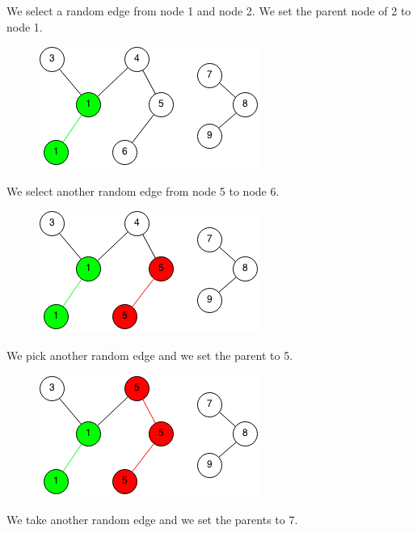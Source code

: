 \documentclass[11pt,oneside]{book}
\makeatletter
\def\maxwidth#1{\ifdim\Gin@nat@width>#1 #1\else\Gin@nat@width\fi}
\makeatother
\begin{document}
We select a random edge from node 1 and node 2. We set the parent node of 2 to node 1.

\vspace{5px}\begin{figure}[H]\centering
        \includegraphics[width=0.66\maxwidth{\textwidth}]{connectedcomponents2.png}
        \end{figure}

We select another random edge from node 5 to node 6.

\vspace{5px}\begin{figure}[H]\centering
        \includegraphics[width=0.66\maxwidth{\textwidth}]{connectedcomponents3.png}
        \end{figure}

We pick another random edge and we set the parent to 5.

\vspace{5px}\begin{figure}[H]\centering
        \includegraphics[width=0.66\maxwidth{\textwidth}]{connectedcomponents4.png}
        \end{figure}

We take another random edge and we set the parents to 7.
\end{document}
